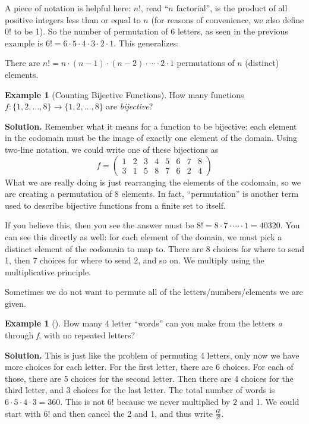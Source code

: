 \documentclass[10pt,]{book}
\theoremstyle{plain}
\theoremstyle{definition}
\theoremstyle{definition}
\newtheorem{example}[theorem]{Example}
\theoremstyle{definition}
\theoremstyle{definition}
\numberwithin{equation}{chapter}
\newcommand{\twoline}[2]{\begin{pmatrix}#1 \\ #2 \end{pmatrix}}
\newcommand{\amp}{&}
\begin{document}
\hypertarget{p-896}{}%
A piece of notation is helpful here: \(n!\), read ``\(n\) factorial'', is the product of all positive integers less than or equal to \(n\) (for reasons of convenience, we also define 0! to be 1). So the number of permutation of 6 letters, as seen in the previous example is \(6! = 6\cdot 5 \cdot 4 \cdot 3 \cdot 2 \cdot 1\). This generalizes:%
\begin{assemblage}\label{assemblage-21}
\hypertarget{p-897}{}%
There are \(n! = n\cdot (n-1)\cdot (n-2)\cdot \cdots \cdot 2\cdot 1\) permutations of \(n\) (distinct) elements.%
\end{assemblage}
\begin{example}[Counting Bijective Functions]\label{example-counting-functions-bijective}
\hypertarget{p-898}{}%
How many functions \(f:\{1,2,\ldots,8\} \to \{1,2,\ldots, 8\}\) are \emph{bijective}?%
\par\smallskip%
\noindent\textbf{Solution.}\hypertarget{solution-97}{}\quad%
\hypertarget{p-899}{}%
Remember what it means for a function to be bijective: each element in the codomain must be the image of exactly one element of the domain. Using two-line notation, we could write one of these bijections as%
\begin{equation*}
f = \twoline{1 \amp 2 \amp 3 \amp 4 \amp 5 \amp 6 \amp 7 \amp 8} {3 \amp 1 \amp 5 \amp 8 \amp 7 \amp 6 \amp 2 \amp 4}
\end{equation*}
What we are really doing is just rearranging the elements of the codomain, so we are creating a permutation of 8 elements. In fact, ``permutation'' is another term used to describe bijective functions from a finite set to itself.%
\par
\hypertarget{p-900}{}%
If you believe this, then you see the answer must be \(8! = 8 \cdot 7 \cdot\cdots\cdot 1 = 40320\). You can see this directly as well: for each element of the domain, we must pick a distinct element of the codomain to map to. There are 8 choices for where to send 1, then 7 choices for where to send 2, and so on. We multiply using the multiplicative principle.%
\end{example}
\hypertarget{p-901}{}%
Sometimes we do not want to permute all of the letters/numbers/elements we are given.%
\begin{example}[]\label{example-44}
\hypertarget{p-902}{}%
How many 4 letter ``words'' can you make from the letters \emph{a} through \emph{f}, with no repeated letters?%
\par\smallskip%
\noindent\textbf{Solution.}\hypertarget{solution-98}{}\quad%
\hypertarget{p-903}{}%
This is just like the problem of permuting 4 letters, only now we have more choices for each letter. For the first letter, there are 6 choices. For each of those, there are 5 choices for the second letter. Then there are 4 choices for the third letter, and 3 choices for the last letter. The total number of words is \(6\cdot 5\cdot 4 \cdot 3 = 360\). This is not \(6!\) because we never multiplied by 2 and 1. We could start with \(6!\) and then cancel the 2 and 1, and thus write \(\frac{6!}{2!}\).%
\end{example}
\end{document}
